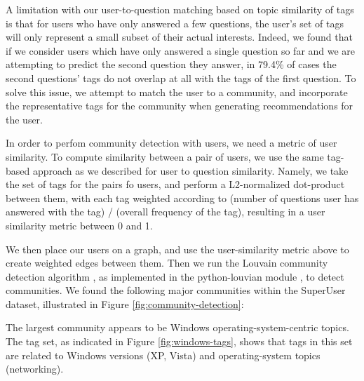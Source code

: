 \documentclass[a4paper]{article}
\begin{document}
A limitation with our user-to-question matching based on topic similarity of tags is that for users who have only answered a few questions, the user's set of tags will only represent a small subset of their actual interests. Indeed, we found that if we consider users which have only answered a single question so far and we are attempting to predict the second question they answer, in 79.4\% of cases the second questions' tags do not overlap at all with the tags of the first question. To solve this issue, we attempt to match the user to a community, and incorporate the representative tags for the community when generating recommendations for the user.

In order to perfom community detection with users, we need a metric of user similarity. To compute similarity between a pair of users, we use the same tag-based approach as we described for user to question similarity. Namely, we take the set of tags for the pairs fo users, and perform a L2-normalized dot-product between them, with each tag weighted according to (number of questions user has answered with the tag) / (overall frequency of the tag), resulting in a user similarity metric between 0 and 1.

We then place our users on a graph, and use the user-similarity metric above to create weighted edges between them. Then we run the Louvain community detection algorithm \cite{louvian}, as implemented in the python-louvian module \cite{python-louvian}, to detect communities. We found the following major communities within the SuperUser dataset, illustrated in Figure \ref{fig:community-detection}:

The largest community appears to be Windows operating-system-centric topics. The tag set, as indicated in Figure \ref{fig:windows-tags}, shows that tags in this set are related to Windows versions (XP, Vista) and operating-system topics (networking).
\end{document}
